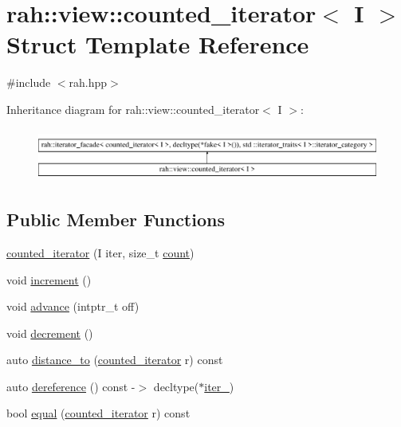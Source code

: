\hypertarget{structrah_1_1view_1_1counted__iterator}{}\section{rah\+::view\+::counted\+\_\+iterator$<$ I $>$ Struct Template Reference}
\label{structrah_1_1view_1_1counted__iterator}


{\ttfamily \#include $<$rah.\+hpp$>$}

Inheritance diagram for rah\+::view\+::counted\+\_\+iterator$<$ I $>$\+:\begin{figure}[H]
\begin{center}
\leavevmode
\includegraphics[height=1.736434cm]{structrah_1_1view_1_1counted__iterator}
\end{center}
\end{figure}
\subsection*{Public Member Functions}
\begin{DoxyCompactItemize}
\item 
\mbox{\hyperlink{structrah_1_1view_1_1counted__iterator_aa26e9c047e175303c296758316634890}{counted\+\_\+iterator}} (I iter, size\+\_\+t \mbox{\hyperlink{namespacerah_aa528865cc4a45d4eb276329554f16b4b}{count}})
\item 
void \mbox{\hyperlink{structrah_1_1view_1_1counted__iterator_a8113f67743f49650c0b4c872bcfd560e}{increment}} ()
\item 
void \mbox{\hyperlink{structrah_1_1view_1_1counted__iterator_abef44b581abb0c70a79dbd6a61ccd200}{advance}} (intptr\+\_\+t off)
\item 
void \mbox{\hyperlink{structrah_1_1view_1_1counted__iterator_abeb34df8feb243fce3eec27d45b19aa2}{decrement}} ()
\item 
auto \mbox{\hyperlink{structrah_1_1view_1_1counted__iterator_afee4b1d8525979cc4b711eba9b524f1d}{distance\+\_\+to}} (\mbox{\hyperlink{structrah_1_1view_1_1counted__iterator}{counted\+\_\+iterator}} r) const
\item 
auto \mbox{\hyperlink{structrah_1_1view_1_1counted__iterator_aa0478a9f3d2083f2cd9c42d32e8e4dd5}{dereference}} () const -\/$>$ decltype($\ast$\mbox{\hyperlink{structrah_1_1view_1_1counted__iterator_a907dba6ac64293e4c5718e522da4972e}{iter\+\_\+}})
\item 
bool \mbox{\hyperlink{structrah_1_1view_1_1counted__iterator_a71ee9eea167eec16b04373885dbff741}{equal}} (\mbox{\hyperlink{structrah_1_1view_1_1counted__iterator}{counted\+\_\+iterator}} r) const
\end{DoxyCompactItemize}
